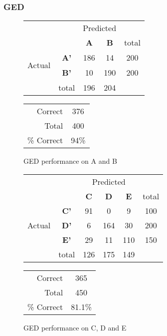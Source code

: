 \subsubsection{GED}
\begin{figure}[!ht]
\begin{minipage}[b]{0.5\linewidth}
\centering
	\begin{tabular}{ccc|c|c}
	 & &\multicolumn{2}{c}{Predicted} &\\
	  & & \bf{A} &  \bf{B} & total \\
	 \cline{3-5}
	 \multirow{2}{*}{\begin{sideways}Actual\end{sideways}} & \bf{A'}& 186 & 14 & 200 \\
	 \cline{3-5}
	 & \bf{B'}& 10 & 190 & 200 \\
	  \cline{3-5}
	 &total&196&204&\\
	\end{tabular}
\end{minipage}
\hspace{0.5cm}
\begin{minipage}[b]{0.5\linewidth}
	\begin{tabular}{r|c}
	\hline
	Correct& 376\\
	Total& 400\\
	\hline
	\% Correct& 94\%\\
	\hline
	\end{tabular}
\end{minipage}
\vspace{1mm}
\caption{GED performance on A and B}
\end{figure}

\begin{figure}[!ht]
\begin{minipage}[b]{0.5\linewidth}
\centering
	\begin{tabular}{ccc|c|c|c}
	 & &\multicolumn{3}{c}{Predicted} &\\
	  & & \bf{C} &  \bf{D} & \bf{E} & total \\
	 \cline{3-5}
	 \multirow{3}{*}{\begin{sideways}Actual\end{sideways}} & \bf{C'}& 91 & 0 & 9 & 100\\
	 \cline{3-6}
	 & \bf{D'}& 6 & 164 & 30 & 200\\
	  \cline{3-6}
	 & \bf{E'}& 29 & 11 & 110 &  150\\
	  \cline{3-6}
	 &total&126&175&149\\
	\end{tabular}
\end{minipage}
\hspace{0.5cm}
\begin{minipage}[b]{0.5\linewidth}
	\begin{tabular}{r|c}
	\hline
	Correct& 365\\
	Total& 450\\
	\hline
	\% Correct& 81.1\%\\
	\hline
	\end{tabular}
\end{minipage}
\vspace{1mm}
\caption{GED performance on C, D and E}
\end{figure}


